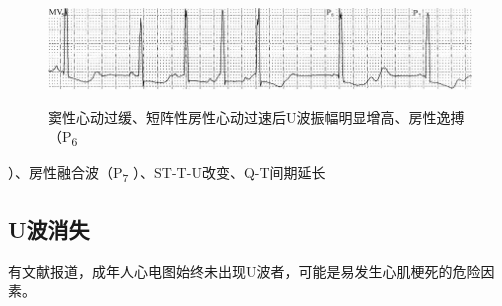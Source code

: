 \begin{figure}[!htbp]
 \centering
 \includegraphics[width=5.78125in,height=1.125in]{./images/Image00124.jpg}
 \captionsetup{justification=centering}
 \caption{窦性心动过缓、短阵性房性心动过速后U波振幅明显增高、房性逸搏（P\textsubscript{6}}
 \label{fig8-5}
  \end{figure} 
）、房性融合波（P\textsubscript{7} ）、ST-T-U改变、Q-T间期延长

\protect\hypertarget{text00014.htmlux5cux23subid115}{}{}

\subsection{U波消失}

有文献报道，成年人心电图始终未出现U波者，可能是易发生心肌梗死的危险因素。

\protect\hypertarget{text00015.html}{}{}

\protect\hypertarget{text00015.htmlux5cux23chapter15}{}{}

